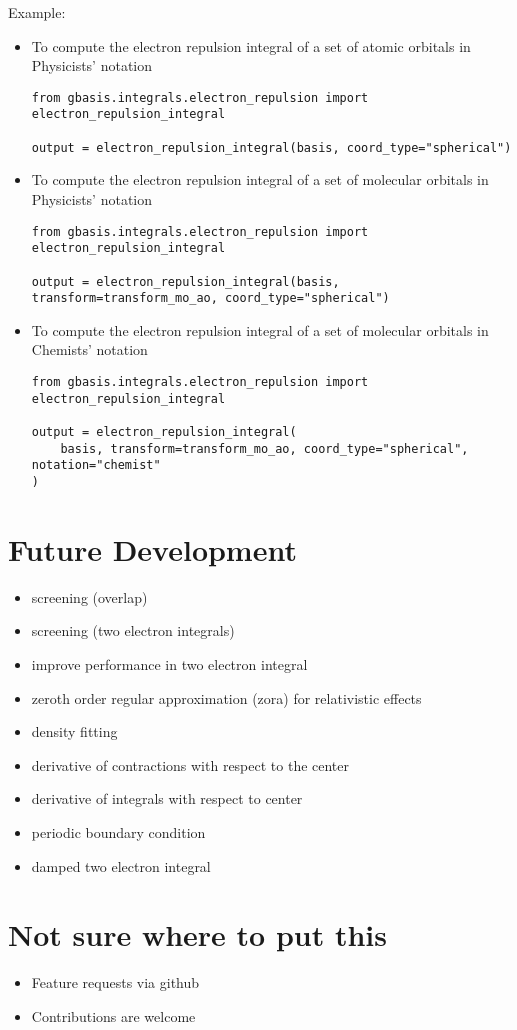 \documentclass[letterpaper]{article}
\begin{document}
Example:
\begin{itemize}
\item To compute the electron repulsion integral of a set of atomic orbitals in
  Physicists' notation
  \begin{lstlisting}[xleftmargin=-25pt]
from gbasis.integrals.electron_repulsion import electron_repulsion_integral

output = electron_repulsion_integral(basis, coord_type="spherical")
\end{lstlisting}
\item To compute the electron repulsion integral of a set of molecular orbitals in
  Physicists' notation
  \begin{lstlisting}[xleftmargin=-25pt]
from gbasis.integrals.electron_repulsion import electron_repulsion_integral

output = electron_repulsion_integral(basis, transform=transform_mo_ao, coord_type="spherical")
\end{lstlisting}
\item To compute the electron repulsion integral of a set of molecular orbitals in
  Chemists' notation
  \begin{lstlisting}[xleftmargin=-25pt]
from gbasis.integrals.electron_repulsion import electron_repulsion_integral

output = electron_repulsion_integral(
    basis, transform=transform_mo_ao, coord_type="spherical", notation="chemist"
)
\end{lstlisting}
\end{itemize}

\section{Future Development}
\begin{itemize}
\item screening (overlap)
\item screening (two electron integrals)
\item improve performance in two electron integral
\item zeroth order regular approximation (zora) for relativistic effects
\item density fitting
\item derivative of contractions with respect to the center
\item derivative of integrals with respect to center
\item periodic boundary condition
\item damped two electron integral
\end{itemize}

\section{Not sure where to put this}
\begin{itemize}
\item Feature requests via github
\item Contributions are welcome
\end{itemize}
\end{document}
